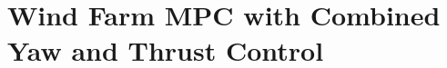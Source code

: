 
\section{Wind Farm MPC with Combined Yaw and Thrust Control} 
\label{sec:WindFarmLinearMPCforWRC-AIC}

